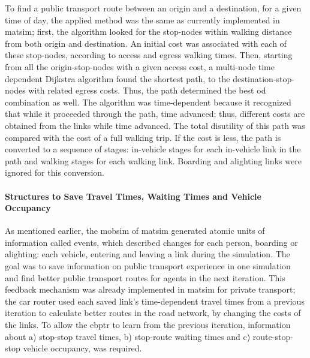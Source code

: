 To find a public transport route between an origin and a destination, for a given time of day, the applied method was the same as currently implemented in \gls{matsim}; first, the algorithm looked for the stop-nodes within walking distance from both origin and destination. An initial cost was associated with each of these stop-nodes, according to access and egress walking times. Then, starting from all the origin-stop-nodes with a given access cost, a multi-node time dependent Dijkstra algorithm found the shortest path, to the destination-stop-nodes with related egress costs. Thus, the path determined the best \gls{od} combination as well. The algorithm was time-dependent because it recognized that while it proceeded through the path, time advanced; thus, different costs are obtained from the links while time advanced. The total disutility of this path was compared with the cost of a full walking trip. If the cost is less, the path is converted to a sequence of stages: in-vehicle stages for each in-vehicle link in the path and walking stages for each walking link. Boarding and alighting links were ignored for this conversion.

\paragraph{Structures to Save Travel Times, Waiting Times and Vehicle Occupancy} 
\label{subsec:Structures}

As mentioned earlier, the \gls{mobsim} of \gls{matsim} generated atomic units of information called \glspl{event}, which described changes for each person, \eg boarding or alighting: each vehicle, \eg entering and leaving a link during the simulation. The goal was to save information on public transport experience in one simulation and find better public transport routes for agents in the next iteration. This feedback mechanism was already implemented in \gls{matsim} for private transport; the car router used each saved link's time-dependent travel times from a previous iteration to calculate better routes in the road network, by changing the costs of the links. To allow the \gls{ebptr} to learn from the previous iteration, information about a) stop-stop travel times, b) stop-route waiting times and c) route-stop-stop vehicle occupancy, was required.

